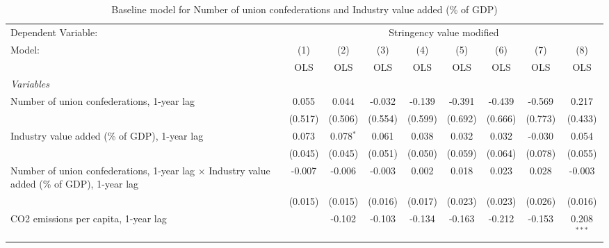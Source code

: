 
\begin{table}[htbp]
   \caption{Baseline model for Number of union confederations and Industry value added (\% of GDP)}
   \centering
   \begin{tabular}{lcccccccc}
      \toprule
      Dependent Variable: & \multicolumn{8}{c}{Stringency value modified}\\
      Model:                                                                                             & (1)     & (2)         & (3)     & (4)          & (5)          & (6)           & (7)           & (8)\\  
                                                                                                         &  OLS    & OLS         & OLS     & OLS          & OLS          & OLS           & OLS           & OLS\\  
      \midrule
      \emph{Variables}\\
      Number of union confederations, 1-year lag                                                         & 0.055   & 0.044       & -0.032  & -0.139       & -0.391       & -0.439        & -0.569        & 0.217\\   
                                                                                                         & (0.517) & (0.506)     & (0.554) & (0.599)      & (0.692)      & (0.666)       & (0.773)       & (0.433)\\   
      Industry value added (\% of GDP), 1-year lag                                                       & 0.073   & 0.078$^{*}$ & 0.061   & 0.038        & 0.032        & 0.032         & -0.030        & 0.054\\   
                                                                                                         & (0.045) & (0.045)     & (0.051) & (0.050)      & (0.059)      & (0.064)       & (0.078)       & (0.055)\\   
      Number of union confederations, 1-year lag $\times$ Industry value added (\% of GDP), 1-year lag   & -0.007  & -0.006      & -0.003  & 0.002        & 0.018        & 0.023         & 0.028         & -0.003\\   
                                                                                                         & (0.015) & (0.015)     & (0.016) & (0.017)      & (0.023)      & (0.023)       & (0.026)       & (0.016)\\   
      CO2 emissions per capita, 1-year lag                                                               &         & -0.102      & -0.103  & -0.134       & -0.163       & -0.212        & -0.153        & 0.208$^{***}$\\   

\end{tabular}
\end{table}
